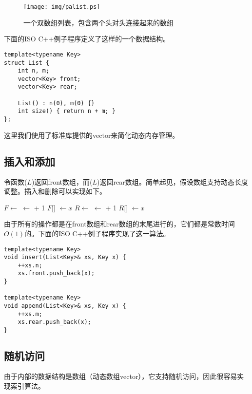 \documentclass[UTF8]{article}
\begin{document}
\begin{figure}[htbp]
  \centering
  \texttt{[image: img/palist.ps]}
  \caption{一个双数组列表，包含两个头对头连接起来的数组} \label{fig:palist}
\end{figure}

下面的ISO C++例子程序定义了这样的一个数据结构。

\lstset{language=C++}
\begin{lstlisting}
template<typename Key>
struct List {
    int n, m;
    vector<Key> front;
    vector<Key> rear;

    List() : n(0), m(0) {}
    int size() { return n + m; }
};
\end{lstlisting}

这里我们使用了标准库提供的vector来简化动态内存管理。

\subsection{插入和添加}
令函数($L$)返回front数组，而($L$)返回rear数组。简单起见，假设数组支持动态长度调整。插入和删除可以实现如下。

\begin{algorithmic}
  \State $F \gets $ 
  \State {} $\gets $  + 1
  \State $F$[] $\gets x$
\EndFunction
\Statex
{}
  \State $R \gets $ 
  \State {} $\gets $  + 1
  \State $R$[] $\gets x$
\EndFunction
\end{algorithmic}

由于所有的操作都是在front数组和rear数组的末尾进行的，它们都是常数时间$O(1)$的。下面的ISO C++例子程序实现了这一算法。

\begin{lstlisting}
template<typename Key>
void insert(List<Key>& xs, Key x) {
    ++xs.n;
    xs.front.push_back(x);
}

template<typename Key>
void append(List<Key>& xs, Key x) {
    ++xs.m;
    xs.rear.push_back(x);
}
\end{lstlisting}

\subsection{随机访问}
由于内部的数据结构是数组（动态数组vector），它支持随机访问，因此很容易实现索引算法。
\end{document}
